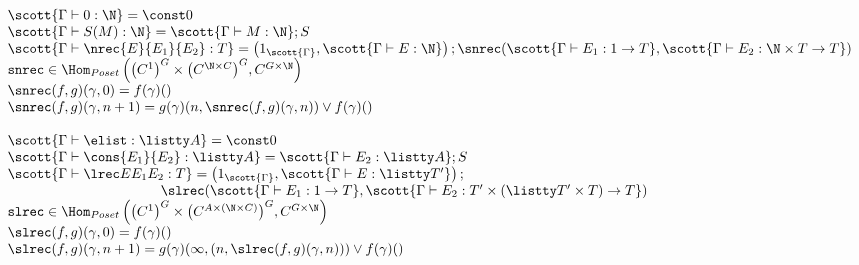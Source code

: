 \begin{small}
\[\begin{array}{l}

\scott{\Gamma \vdash 0 : \N} = \const 0\\
\scott{\Gamma \vdash S(M) : \N} = \scott{\Gamma \vdash M : \N} ; S\\
\scott{\Gamma \vdash \nrec {E} {E_1} {E_2} : T} = \left(1_{\scott{\Gamma}}, \scott{\Gamma \vdash E : \N}\right) ; \snrec(\scott{\Gamma \vdash E_1 : 1 \to T},\scott{\Gamma \vdash E_2 : \N\times T \to T})\\
\texttt{snrec} \in \Hom_{Poset}\left({\left(C^1\right)}^G\times {\left(C^{\N\times C}\right)}^G,C^{G\times\N}\right)\\
\snrec(f,g)(\gamma,0) = f(\gamma)()\\
\snrec(f,g)(\gamma,n+1) = g(\gamma)(n,\snrec(f,g)(\gamma,n)) \vee f(\gamma)()\\

\\
\scott{\Gamma \vdash \elist : \listty A} = \const 0\\
\scott{\Gamma \vdash \cons {E_1} {E_2} : \listty A} = \scott{\Gamma \vdash E_2 : \listty A} ; S\\
\scott{\Gamma \vdash \lrec E {E_1} {E_2} : T} = \left(1_{\scott{\Gamma}}, \scott{\Gamma \vdash E : \listty T'}\right) ; \\
\hspace{11em}\slrec(\scott{\Gamma \vdash E_1 : 1 \to T},\scott{\Gamma \vdash E_2 : T' \times (\listty T' \times T) \to T})\\
\texttt{slrec} \in  \Hom_{Poset}\left({\left(C^1\right)^G} \times {\left(C^{A \times (\N \times C)}\right)^G},C^{G \times \N}\right)\\
\slrec(f,g)(\gamma,0) = f(\gamma)()\\
\slrec(f,g)(\gamma,n+1) = g(\gamma)(\infty,(n,\slrec(f,g)(\gamma,n))) \vee f(\gamma)()\\

\end{array}
\]
\end{small}
